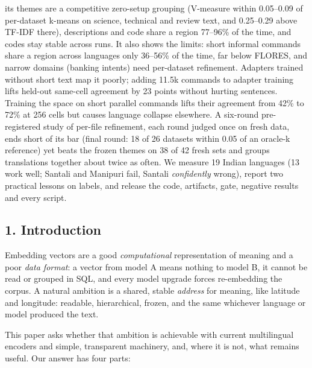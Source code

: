 \documentclass[
  10pt,
]{article}
\begin{document}
its themes are a competitive zero-setup grouping (V-measure within
0.05--0.09 of per-dataset k-means on science, technical and review text,
and 0.25--0.29 above TF-IDF there), descriptions and code share a region
77--96\% of the time, and codes stay stable across runs. It also shows
the limits: short informal commands share a region across languages only
36--56\% of the time, far below FLORES, and narrow domains (banking
intents) need per-dataset refinement. Adapters trained without short
text map it poorly; adding 11.5k commands to adapter training lifts
held-out same-cell agreement by 23 points without hurting sentences.
Training the space on short parallel commands lifts their agreement from
42\% to 72\% at 256 cells but causes language collapse elsewhere. A
six-round pre-registered study of per-file refinement, each round judged
once on fresh data, ends short of its bar (final round: 18 of 26
datasets within 0.05 of an oracle-k reference) yet beats the frozen
themes on 38 of 42 fresh sets and groups translations together about
twice as often. We measure 19 Indian languages (13 work well; Santali
and Manipuri fail, Santali \emph{confidently} wrong), report two
practical lessons on labels, and release the code, artifacts, gate,
negative results and every script.

\hypertarget{introduction}{%
\subsection{1. Introduction}\label{introduction}}

Embedding vectors are a good \emph{computational} representation of
meaning and a poor \emph{data format}: a vector from model A means
nothing to model B, it cannot be read or grouped in SQL, and every model
upgrade forces re-embedding the corpus. A natural ambition is a shared,
stable \emph{address} for meaning, like latitude and longitude:
readable, hierarchical, frozen, and the same whichever language or model
produced the text.

This paper asks whether that ambition is achievable with current
multilingual encoders and simple, transparent machinery, and, where it
is not, what remains useful. Our answer has four parts:
\end{document}
